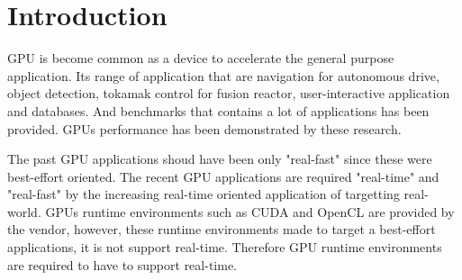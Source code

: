\section{Introduction}
GPU is become common as a device to accelerate the general purpose application.
Its range of application that are navigation\cite{cmu:routing} for autonomous drive, object detection\cite{hirabayashi:cpsna2013},
tokamak control for fusion reactor\cite{tokamak},
user-interactive application\cite{kato:rtas2011} and  databases\cite{bakkum:sql}.
And benchmarks\cite{rodinia} that contains a lot of applications has been provided.
GPUs performance has been demonstrated by these research.

The past GPU applications shoud have been only "real-fast" since these were best-effort oriented.
The recent GPU applications are required "real-time" and "real-fast" by the increasing real-time oriented application of targetting real-world.
GPUs runtime environments such as CUDA\cite{nvidia:cuda_zone} and OpenCL\cite{opencl} are provided by the vendor,
however, these runtime environments made to target a best-effort applications, it is not support real-time.
Therefore GPU runtime environments are required to have to support real-time.

